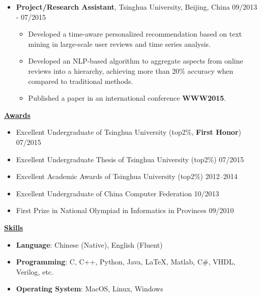 \documentclass[11pt]{article}
\begin{document}
\begin{CJK}{GBK}{kai}
\begin{itemize}
   \item \textbf{Project/Research Assistant}, Tsinghua University, Beijing, China \hfill 09/2013 - 07/2015\\
     \begin{itemize}
     \item Developed a time-aware personalized recommendation based on text mining in large-scale user reviews and time series analysis. 
     \item Developed an NLP-based algorithm to aggregate aspects from online reviews into a hierarchy, achieving more than 20\% accuracy when compared to traditional methods.
     \item Published a paper in an international conference \textbf{WWW2015}.
     \end{itemize}
\end{itemize}


\bigskip

{ \textbf{\underline{Awards}}}\\
\begin{itemize}
\item Excellent Undergraduate of Tsinghua University (top2\%, \textbf{First Honor}) \hfill 07/2015
\item Excellent Undergraduate Thesis of Tsinghua University (top2\%) \hfill 07/2015
\item Excellent Academic Awards of Tsinghua University (top2\%) \hfill 2012--2014
\item Excellent Undergraduate of China Computer Federation \hfill 10/2013
\item First Prize in National Olympiad in Informatics in Provinces \hfill 09/2010
\end{itemize}

\bigskip

{ \textbf{\underline{Skills}}}
\begin{itemize}
    \item \textbf{Language}: Chinese (Native), English (Fluent)\\\smallskip
    \item \textbf{Programming}: C, C++, Python, Java, {\LaTeX},  Matlab, C\#, VHDL, Verilog, etc.\\\smallskip
    \item \textbf{Operating System}: MacOS, Linux, Windows
\end{itemize}

\end{CJK}
\end{document}
